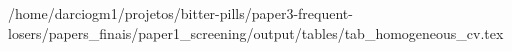 /home/darciogm1/projetos/bitter-pills/paper3-frequent-losers/papers_finais/paper1_screening/output/tables/tab_homogeneous_cv.tex